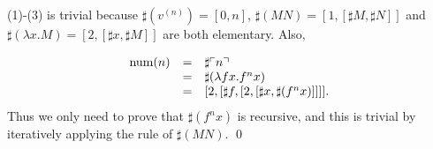 \begin{pf} \rm
 (1)-(3) is trivial because $\sharp(v^{(n)})=[0,n]$,
 $\sharp(MN)=[1,[\sharp M, \sharp N]]$ and
 $\sharp(\lambda x.M) = [2, [\sharp x, \sharp M]]$ are both elementary. Also, 

 \[
  \begin{array}{rcl}
    \mathrm{num}(n) & = & \sharp\ulcorner{n}\urcorner \\
    & = & \sharp( \lambda fx. f^n x )  \\
    & = & 
      [2,
	[
	  \sharp f,
	  [
	    2, [
	      \sharp x, \sharp(f^n x)
	    ]]
	]
      ].
  \end{array}
 \]
 Thus we only need to prove that $\sharp(f^n x)$ is recursive, and this is trivial
 by iteratively applying the rule of $\sharp(MN)$.
 \qed
\end{pf}
